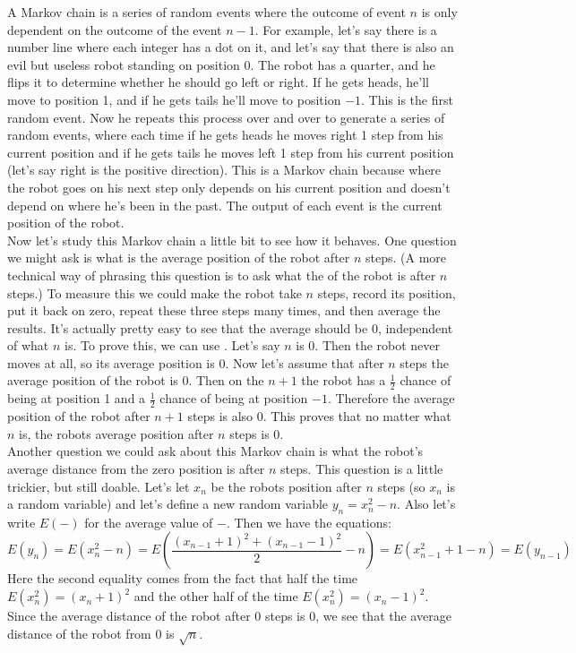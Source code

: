 
A Markov chain is a series of random events where the outcome of event $n$ is only dependent on the outcome of the event $n-1$. For example, let's say there is a number line where each integer has a dot on it, and let's say that there is also an evil but useless robot standing on position 0. The robot has a quarter, and he flips it to determine whether he should go left or right. If he gets heads, he'll move to position 1, and if he gets tails he'll move to position $-1$. This is the first random event. Now he repeats this process over and over to generate a series of random events, where each time if he gets heads he moves right 1 step from his current position and if he gets tails he moves left 1 step from his current position (let's say right is the positive direction). This is a Markov chain because where the robot goes on his next step only depends on his current position and doesn't depend on where he's been in the past. The output of each event is the current position of the robot. \\

Now let's study this Markov chain a little bit to see how it behaves. One question we might ask is what is the average position of the robot after $n$ steps. (A more technical way of phrasing this question is to ask what the  of the robot is after $n$ steps.) To measure this we could make the robot take $n$ steps, record its position, put it back on zero, repeat these three steps many times, and then average the results. It's actually pretty easy to see that the average should be 0, independent of what $n$ is. To prove this, we can use . Let's say $n$ is 0. Then the robot never moves at all, so its average position is 0. Now let's assume that after $n$ steps the average position of the robot is 0. Then on the $n+1$ the robot has a $\frac{1}{2}$ chance of being at position 1 and a $\frac{1}{2}$ chance of being at position $-1$. Therefore the average position of the robot after $n+1$ steps is also 0. This proves that no matter what $n$ is, the robots average position after $n$ steps is 0. \\

Another question we could ask about this Markov chain is what the robot's average distance from the zero position is after $n$ steps. This question is a little trickier, but still doable. Let's let  $x_n$ be the robots position after $n$ steps (so $x_n$ is a random variable) and let's define a new random variable $y_n=x_n^2-n$. Also let's write $E(-)$ for the average value of $-$. Then we have the equations: 
	\[
	E(y_n)=E(x_n^2-n)=E\left( \frac{(x_{n-1}+1)^2+(x_{n-1}-1)^2}{2} - n \right)=E(x_{n-1}^2+1-n)=E(y_{n-1})
	\]
Here the second equality comes from the fact that half the time $E(x_n^2)=(x_n+1)^2$ and the other half of the time $E(x_n^2)=(x_n-1)^2$. Since the average distance of the robot after 0 steps is 0, we see that the average distance of the robot from 0 is $\sqrt{n}$.

